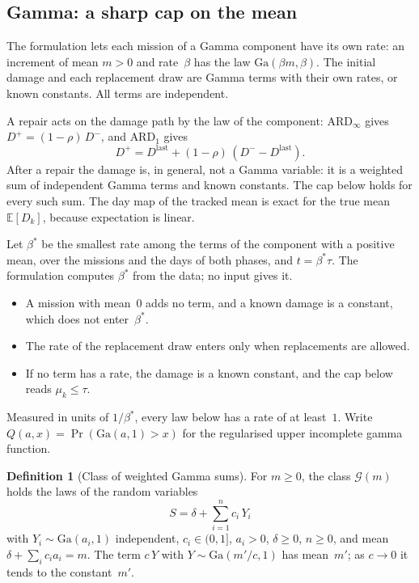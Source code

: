 \documentclass[11pt,a4paper]{article}
\theoremstyle{plain}
\theoremstyle{definition}
\newtheorem{definition}[theorem]{Definition}
\theoremstyle{remark}
\begin{document}
\subsection{Gamma: a sharp cap on the mean}
The formulation lets each mission of a Gamma component have its own rate: an increment of mean $m > 0$ and rate~$\beta$ has the law $\mathrm{Ga}(\beta m, \beta)$.
The initial damage and each replacement draw are Gamma terms with their own rates, or known constants.
All terms are independent.

A repair acts on the damage path by the law of the component: $\text{ARD}_\infty$ gives $D^+ = (1-\rho)\,D^-$, and $\text{ARD}_1$ gives
\begin{equation}
  D^+ = D^{\mathrm{last}} + (1-\rho)\,(D^- - D^{\mathrm{last}}).
\end{equation}
After a repair the damage is, in general, not a Gamma variable: it is a weighted sum of independent Gamma terms and known constants.
The cap below holds for every such sum.
The day map of the tracked mean is exact for the true mean $\mathbb{E}[D_k]$, because expectation is linear.

Let $\beta^*$ be the smallest rate among the terms of the component with a positive mean, over the missions and the days of both phases, and $t = \beta^*\tau$.
The formulation computes $\beta^*$ from the data; no input gives it.
\begin{itemize}
  \item A mission with mean~$0$ adds no term, and a known damage is a constant, which does not enter~$\beta^*$.
  \item The rate of the replacement draw enters only when replacements are allowed.
  \item If no term has a rate, the damage is a known constant, and the cap below reads $\mu_k \le \tau$.
\end{itemize}
Measured in units of $1/\beta^*$, every law below has a rate of at least~$1$.
Write $Q(a, x) = \Pr(\mathrm{Ga}(a,1) > x)$ for the regularised upper incomplete gamma function.

\begin{definition}[Class of weighted Gamma sums]\label{def:gamma_class}
For $m \ge 0$, the class $\mathcal{G}(m)$ holds the laws of the random variables
\begin{equation}
  S = \delta + \sum_{i=1}^{n} c_i\, Y_i
\end{equation}
with $Y_i \sim \mathrm{Ga}(a_i, 1)$ independent, $c_i \in (0,1]$, $a_i > 0$, $\delta \ge 0$, $n \ge 0$, and mean $\delta + \sum_i c_i a_i = m$.
The term $c\,Y$ with $Y \sim \mathrm{Ga}(m'/c, 1)$ has mean~$m'$; as $c \to 0$ it tends to the constant~$m'$.
\end{definition}
\end{document}
